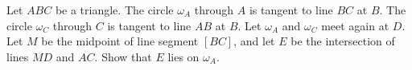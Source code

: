 Let $ABC$ be a triangle.  The circle $\omega_A$ through $A$ is tangent to line $BC$ at $B$. The circle $\omega_C$ through $C$ is tangent to line $AB$ at $B$.  Let $\omega_A$ and $\omega_C$ meet again at $D$. Let $M$ be the midpoint of line segment $[BC]$, and let $E$ be the intersection of lines $MD$ and $AC$. Show that $E$ lies on $\omega_A$.
